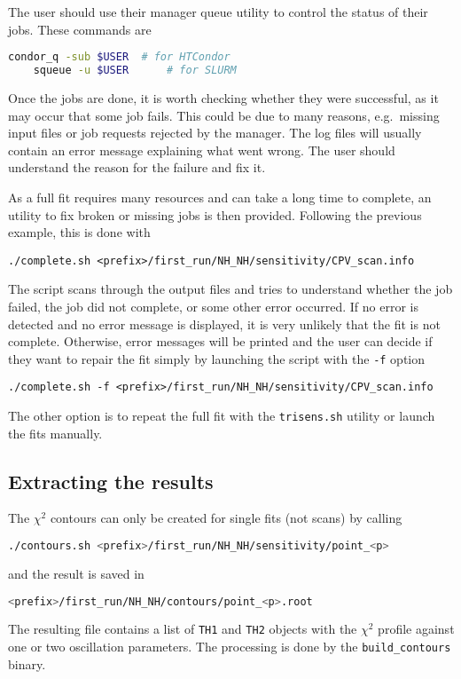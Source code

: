\documentclass[a4paper, 11pt]{article}
\begin{document}
The user should use their manager queue utility to control the status of their jobs.
These commands are
\begin{lstlisting}[language=bash]
	condor_q -sub $USER  # for HTCondor
	squeue -u $USER      # for SLURM
\end{lstlisting}
Once the jobs are done, it is worth checking whether they were successful, %
as it may occur that some job fails.
This could be due to many reasons, e.g.\ missing input files or job requests rejected by the manager.
The log files will usually contain an error message explaining what went wrong.
The user should understand the reason for the failure and fix it.

As a full fit requires many resources and can take a long time to complete, %
an utility to fix broken or missing jobs is then provided.
Following the previous example, this is done with
\begin{lstlisting}[]
	./complete.sh <prefix>/first_run/NH_NH/sensitivity/CPV_scan.info
\end{lstlisting}
The script scans through the output files and tries to understand whether the job failed, %
the job did not complete, or some other error occurred.
If no error is detected and no error message is displayed, it is very unlikely that the fit %
is not complete.
Otherwise, error messages will be printed and the user can decide if they want to repair the fit %
simply by launching the script with the \texttt{-f} option
\begin{lstlisting}[]
	./complete.sh -f <prefix>/first_run/NH_NH/sensitivity/CPV_scan.info
\end{lstlisting}
The other option is to repeat the full fit with the \texttt{trisens.sh} utility %
or launch the fits manually.

\subsection{Extracting the results}

The $\chi^2$ contours can only be created for single fits (not scans) by calling
\begin{lstlisting}[language=bash]
	./contours.sh <prefix>/first_run/NH_NH/sensitivity/point_<p>
\end{lstlisting}
and the result is saved in 
\begin{lstlisting}[language=bash]
	<prefix>/first_run/NH_NH/contours/point_<p>.root
\end{lstlisting}
The resulting file contains a list of \texttt{TH1} and \texttt{TH2} objects with the %
$\chi^2$ profile against one or two oscillation parameters.
The processing is done by the \texttt{build\_contours} binary.
\end{document}
